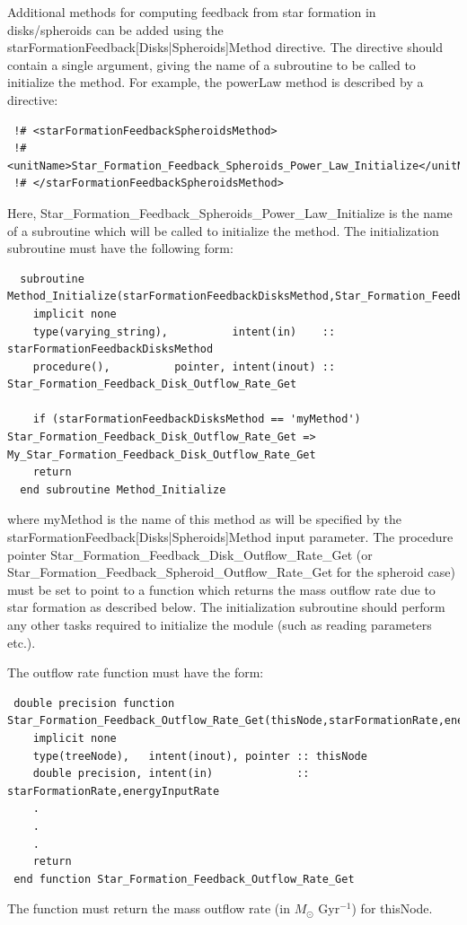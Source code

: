 Additional methods for computing feedback from star formation in disks/spheroids can be added using the {\normalfont \ttfamily starFormationFeedback[Disks|Spheroids]Method} directive. The directive should contain a single argument, giving the name of a subroutine to be called to initialize the method. For example, the {\normalfont \ttfamily powerLaw} method is described by a directive:
\begin{verbatim}
 !# <starFormationFeedbackSpheroidsMethod>
 !#  <unitName>Star_Formation_Feedback_Spheroids_Power_Law_Initialize</unitName>
 !# </starFormationFeedbackSpheroidsMethod>
\end{verbatim}
Here, {\normalfont \ttfamily Star\_Formation\_Feedback\_Spheroids\_Power\_Law\_Initialize} is the name of a subroutine which will be called to initialize the method. The initialization subroutine must have the following form:
\begin{verbatim}
  subroutine Method_Initialize(starFormationFeedbackDisksMethod,Star_Formation_Feedback_Disk_Outflow_Rate_Get)
    implicit none
    type(varying_string),          intent(in)    :: starFormationFeedbackDisksMethod
    procedure(),          pointer, intent(inout) :: Star_Formation_Feedback_Disk_Outflow_Rate_Get
    
    if (starFormationFeedbackDisksMethod == 'myMethod') Star_Formation_Feedback_Disk_Outflow_Rate_Get => My_Star_Formation_Feedback_Disk_Outflow_Rate_Get
    return
  end subroutine Method_Initialize
\end{verbatim}
where {\normalfont \ttfamily myMethod} is the name of this method as will be specified by the {\normalfont \ttfamily starFormationFeedback[Disks|Spheroids]Method} input parameter. The procedure pointer {\normalfont \ttfamily Star\_Formation\_Feedback\_Disk\_Outflow\_Rate\_Get} (or {\normalfont \ttfamily Star\_Formation\_Feedback\_Spheroid\_Outflow\_Rate\_Get} for the spheroid case) must be set to point to a function which returns the mass outflow rate due to star formation as described below. The initialization subroutine should perform any other tasks required to initialize the module (such as reading parameters etc.).

The outflow rate function must have the form:
\begin{verbatim}
 double precision function Star_Formation_Feedback_Outflow_Rate_Get(thisNode,starFormationRate,energyInputRate)
    implicit none
    type(treeNode),   intent(inout), pointer :: thisNode
    double precision, intent(in)             :: starFormationRate,energyInputRate
    .
    .
    .
    return
 end function Star_Formation_Feedback_Outflow_Rate_Get
\end{verbatim}
The function must return the mass outflow rate (in $M_\odot$ Gyr$^{-1}$) for {\normalfont \ttfamily thisNode}.

